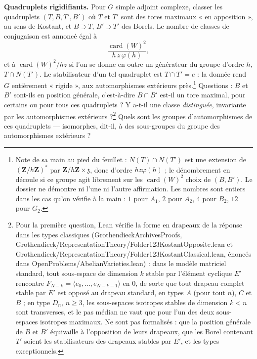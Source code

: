 \documentclass[11pt,a4paper]{article}
\begin{document}
\textbf{Quadruplets rigidifiants.} Pour $G$ simple adjoint complexe, classer les
quadruplets $(T,B,T',B')$ où $T$ et $T'$ sont des tores maximaux « en
apposition », au sens de Kostant, et $B\supset T$, $B'\supset T'$ des Borels.
Le nombre de classes de conjugaison est annoncé égal à
\[
  \frac{\operatorname{card}(W)^{2}}{h\,z\,\varphi(h)} ,
\]
et à $\operatorname{card}(W)^{2}/hz$ si l'on se donne en outre un générateur du
groupe d'ordre $h$, $T\cap N(T')$. Le stabilisateur d'un tel quadruplet est
$T\cap T'=e$ : la donnée rend $G$ entièrement « rigide », aux automorphismes
extérieurs près.\footnote{Note de sa main au pied du feuillet :
$N(T)\cap N(T')$ est une extension de $(\mathbf{Z}/h\mathbf{Z})^{*}$ par
$\mathbf{Z}/h\mathbf{Z}\times\mathfrak{z}$, donc d'ordre $hz\varphi(h)$ ; le
dénombrement en découle si ce groupe agit librement sur les
$\operatorname{card}(W)^{2}$ choix de $(B,B')$. Le dossier ne démontre ni
l'une ni l'autre affirmation. Les nombres sont entiers dans les cas qu'on
vérifie à la main : $1$ pour $A_{1}$, $2$ pour $A_{2}$, $4$ pour $B_{2}$, $12$
pour $G_{2}$.} Questions : $B$ et $B'$ sont-ils en position générale,
c'est-à-dire $B\cap B'$ est-il un tore maximal, pour certains ou pour tous ces
quadruplets ? Y a-t-il une classe \emph{distinguée}, invariante par les
automorphismes extérieurs ?\footnote{Pour la première question, Lean vérifie la
forme en drapeaux de la réponse dans les types classiques (GrothendieckArchivesProofs,
Grothendieck/RepresentationTheory/Folder123KostantOpposite.lean et Grothendieck/RepresentationTheory/Folder123KostantClassical.lean,
énoncés dans OpenProblems/AbelianVarieties.lean) : dans le modèle matriciel standard,
tout sous-espace de dimension $k$ stable par l'élément cyclique $E'$ rencontre
$F_{N-k} = \langle e_{0}, \ldots, e_{N-k-1}\rangle$ en $0$, de sorte que tout drapeau
complet stable par $E'$ est opposé au drapeau standard, en types $A$ (pour tout $n$),
$C$ et $B$ ; en type $D_{n}$, $n \geq 3$, les sous-espaces isotropes stables de
dimension $k < n$ sont transverses, et le pas médian ne vaut que pour l'un des deux
sous-espaces isotropes maximaux. Ne sont pas formalisés : que la position générale
de $B$ et $B'$ équivaille à l'opposition de leurs drapeaux, que les Borel contenant
$T'$ soient les stabilisateurs des drapeaux stables par $E'$, et les types
exceptionnels.} Quels sont les groupes d'automorphismes de ces
quadruplets — isomorphes, dit-il, à des sous-groupes du groupe des
automorphismes extérieurs ?
\end{document}
